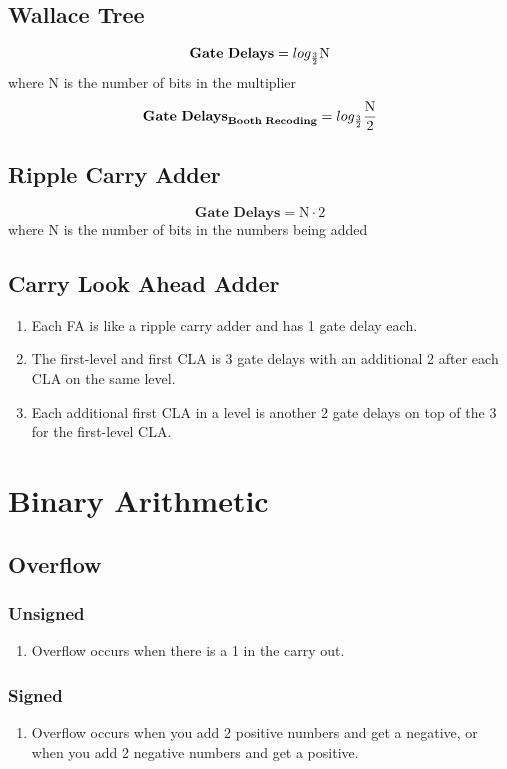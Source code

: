 \documentclass[12pt]{article}
\begin{document}
\subsection*{Wallace Tree}
\[
	\mathrm{\textbf{Gate\;Delays}} = log_{\frac{3}{2}} \mathrm{N}
\]
where N is the number of bits in the multiplier\\
\[
	\mathrm{\textbf{Gate\;Delays}}_{\mathrm{\textbf{Booth\;Recoding}}} = log_{\frac{3}{2}} \frac{\mathrm{N}}{2}
\]
\subsection*{Ripple Carry Adder}
\[
	\mathrm{\textbf{Gate Delays}} = \text{N}\cdot{2}
\]
where N is the number of bits in the numbers being added
\subsection*{Carry Look Ahead Adder}
\begin{enumerate}
\item{Each FA is like a ripple carry adder and has 1 gate delay each.}
\item{The first-level and first CLA is 3 gate delays with an additional 2 after each CLA on the same level.}
\item{Each additional first CLA in a level is another 2 gate delays on top of the 3 for the first-level CLA.}
\end{enumerate}
\section{Binary Arithmetic}

\subsection*{Overflow}
\subsubsection*{Unsigned}
\begin{enumerate}
	\item{Overflow occurs when there is a 1 in the carry out.}
\end{enumerate}

\subsubsection*{Signed}
\begin{enumerate}
	\item{Overflow occurs when you add 2 positive numbers and get a negative, or when you add 2 negative numbers and get a positive.}
\end{enumerate}
\end{document}
